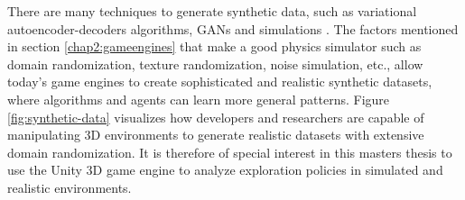 There are many techniques to generate synthetic data, such as variational autoencoder-decoders algorithms, GANs and simulations \cite{8_andrews_2021}. The factors mentioned in section \ref{chap2:gameengines} that make a good physics simulator such as domain randomization, texture randomization, noise simulation, etc., allow today's game engines to create sophisticated and realistic synthetic datasets, where algorithms and agents can learn more general patterns. Figure \ref{fig:synthetic-data} visualizes how developers and researchers are capable of manipulating 3D environments to generate realistic datasets with extensive domain randomization. It is therefore of special interest in this masters thesis to use the Unity 3D game engine to analyze exploration policies in simulated and realistic environments.






